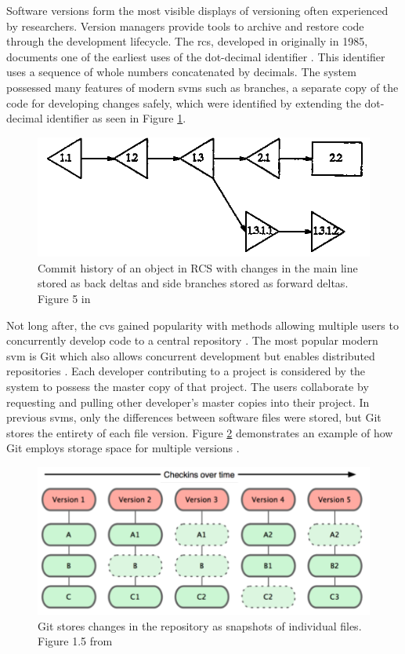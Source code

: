 Software versions form the most visible displays of versioning often experienced by researchers.
Version managers provide tools to archive and restore code through the development lifecycle.
The \gls{rcs}, developed in originally in 1985, documents one of the earliest uses of the dot-decimal identifier \cite{tichy1985rcs}.
This identifier uses a sequence of whole numbers concatenated by decimals.
The system possessed many features of modern \glspl{svm} such as branches, a separate copy of the code for developing changes safely, which were identified by extending the dot-decimal identifier as seen in Figure \ref{RCSTree}.
\begin{figure}
	\centering
	\includegraphics[scale=0.75]{figures/RCSCommitTree.png}
	\caption[Commit history of an object in RCS with changes in the main line stored as back deltas and side branches stored as forward deltas.]{Commit history of an object in RCS with changes in the main line stored as back deltas and side branches stored as forward deltas.  Figure 5 in \cite{tichy1985rcs}}
	\label{RCSTree}
\end{figure}
Not long after, the \gls{cvs} gained popularity with methods allowing multiple users to concurrently develop code to a central repository \cite{cederqvist2002version}.
The most popular modern \gls{svm} is Git which also allows concurrent development but enables distributed repositories \cite{Chacon:2009:PG:1618548}.
Each developer contributing to a project is considered by the system to possess the master copy of that project.
The users collaborate by requesting and pulling other developer's master copies into their project.
In previous \glspl{svm}, only the differences between software files were stored, but Git stores the entirety of each file version.
Figure \ref{GITFile} demonstrates an example of how Git employs storage space for multiple versions \cite{Chacon:2009:PG:1618548}.
\begin{figure}
	\centering
	\includegraphics[scale=0.50]{figures/GITFiles.png}
	\caption[Git stores changes in the repository as snapshots of individual files.]{Git stores changes in the repository as snapshots of individual files. Figure 1.5 from \cite{Chacon:2009:PG:1618548}}
	\label{GITFile}
\end{figure}
